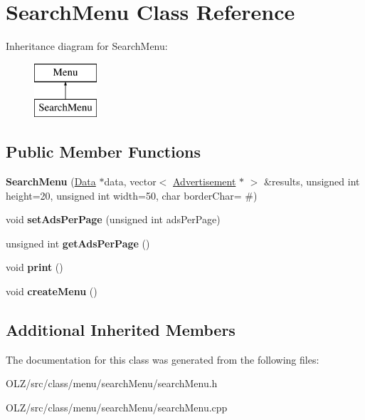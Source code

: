 \hypertarget{class_search_menu}{}\section{Search\+Menu Class Reference}
\label{class_search_menu}
Inheritance diagram for Search\+Menu\+:\begin{figure}[H]
\begin{center}
\leavevmode
\includegraphics[height=2.000000cm]{class_search_menu}
\end{center}
\end{figure}
\subsection*{Public Member Functions}
\begin{DoxyCompactItemize}
\item 
\hypertarget{class_search_menu_a00b814c6254bc67bf059c0a56529eeb0}{}{\bfseries Search\+Menu} (\hyperlink{class_data}{Data} $\ast$data, vector$<$ \hyperlink{class_advertisement}{Advertisement} $\ast$ $>$ \&results, unsigned int height=20, unsigned int width=50, char border\+Char= \textquotesingle{}\#\textquotesingle{})\label{class_search_menu_a00b814c6254bc67bf059c0a56529eeb0}

\item 
\hypertarget{class_search_menu_a506fce847fc8201ccc63d3fbc2ede3b8}{}void {\bfseries set\+Ads\+Per\+Page} (unsigned int ads\+Per\+Page)\label{class_search_menu_a506fce847fc8201ccc63d3fbc2ede3b8}

\item 
\hypertarget{class_search_menu_a39156ea5dcb600c0bf12eadc503f7268}{}unsigned int {\bfseries get\+Ads\+Per\+Page} ()\label{class_search_menu_a39156ea5dcb600c0bf12eadc503f7268}

\item 
\hypertarget{class_search_menu_a4fbc2741c5d72f4fe7473e5de5a5d14e}{}void {\bfseries print} ()\label{class_search_menu_a4fbc2741c5d72f4fe7473e5de5a5d14e}

\item 
\hypertarget{class_search_menu_a97f499b313e88142590aa51c2ef82f3d}{}void {\bfseries create\+Menu} ()\label{class_search_menu_a97f499b313e88142590aa51c2ef82f3d}

\end{DoxyCompactItemize}
\subsection*{Additional Inherited Members}


The documentation for this class was generated from the following files\+:\begin{DoxyCompactItemize}
\item 
O\+L\+Z/src/class/menu/search\+Menu/search\+Menu.\+h\item 
O\+L\+Z/src/class/menu/search\+Menu/search\+Menu.\+cpp\end{DoxyCompactItemize}
